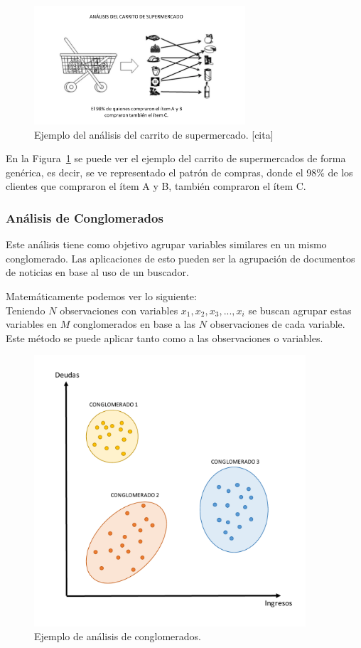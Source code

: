 \begin{figure}[H]
  \centering
    \includegraphics[width=0.7\textwidth]{Figuras/Carrito}
      \caption{Ejemplo del análisis del carrito de supermercado. [cita]}
    \label{fig:carrito}
\end{figure}

En la Figura~\ref{fig:carrito} se puede ver el ejemplo del carrito de supermercados de forma genérica, es decir, se ve representado el patrón de compras, donde el 98\% de los clientes que compraron el ítem A y B, también compraron el ítem C. 

\subsubsection{Análisis de Conglomerados}
Este análisis tiene como objetivo agrupar variables similares en un mismo conglomerado. Las aplicaciones de esto pueden ser la agrupación de documentos de noticias en base al uso de un buscador.

Matemáticamente podemos ver lo siguiente:\\
Teniendo $N$ observaciones con variables $x_1, x_2, x_3, ... , x_i$ se buscan agrupar estas variables en $M$ conglomerados en base a las $N$ observaciones de cada variable. Este método se puede aplicar tanto como a las observaciones o variables.

\begin{figure}[H]
  \centering
    \includegraphics[width=0.9\textwidth]{Figuras/Conglomerados}
      \caption{Ejemplo de análisis de conglomerados.}
    \label{fig:conglomerado}
\end{figure}

